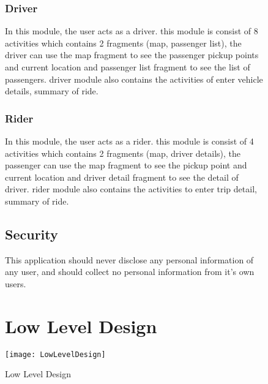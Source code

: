 \begin{figure}
\subsubsection{Driver}
In this module, the user acts as a driver. this module is consist of 8 activities which contains 2 fragments (map, passenger list), the driver can use the map fragment to see the passenger pickup points and current location and passenger list fragment to see the list of passengers. driver module also contains the activities of enter vehicle details, summary of ride.
\end{figure}

\begin{figure}
\subsubsection{Rider}
In this module, the user acts as a rider. this module is consist of 4 activities  which contains 2 fragments (map, driver details), the passenger can use the map fragment to see the pickup point and current location and driver detail fragment to see the detail of driver. rider module also contains the activities to enter trip detail, summary of ride.
\end{figure}

\begin{figure}
\subsection{Security} 		
This application should never disclose any personal information of any user, and should collect no personal information from it's own users.
\end{figure}

\begin{figure}
\section{Low Level Design} 
\texttt{[image: LowLevelDesign]}
\caption{Low Level Design}
\label{fig:Low Level Design}
\center
\end{figure}

